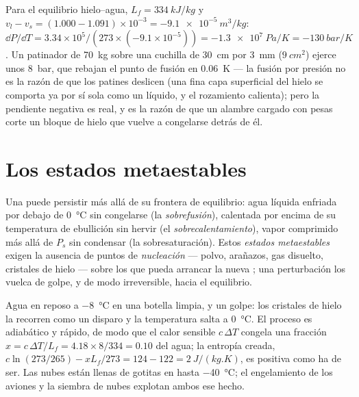 \begin{example}\label{ex:b1:phase-changes:skate}
Para el equilibrio hielo--agua, $L_f = \qty{334}{kJ/kg}$ y $v_l - v_s = (1.000 - 1.091)
\times 10^{-3} = \qty{-9.1e-5}{m^3/kg}$: $\dd P/\dd T = 3.34 \times 10^5/(273 \times
(-9.1 \times 10^{-5})) = \qty{-1.3e7}{Pa/K} = \qty{-130}{bar/K}$. Un patinador
de \qty{70}{kg} sobre una cuchilla de \qty{30}{cm} por \qty{3}{mm} ($\qty{9}{cm^2}$) ejerce
unos \qty{8}{bar}, que rebajan el punto de fusión en \qty{0.06}{K} --- la fusión por presión no es la razón de que los patines deslicen (una fina
capa superficial del hielo se comporta ya por sí sola como un líquido, y
el rozamiento calienta); pero la pendiente negativa es real, y es la
razón de que un alambre cargado con pesas corte un bloque de hielo que
vuelve a congelarse detrás de él.
\end{example}

\section{Los estados metaestables}

\begin{definition}\label{def:b1:phase-changes:metastable}
Una  puede persistir más allá de su frontera de equilibrio: agua
líquida enfriada por debajo de \qty{0}{\degreeCelsius} sin congelarse (la
\emph{sobrefusión}), calentada por encima de su temperatura de ebullición
sin hervir (el \emph{sobrecalentamiento}), vapor comprimido más allá de
$P_s$ sin condensar (la sobresaturación). Estos \emph{estados
metaestables} exigen la ausencia de puntos de \emph{nucleación} --- polvo,
arañazos, gas disuelto, cristales de hielo --- sobre los que pueda
arrancar la nueva ; una perturbación los vuelca de golpe, y de modo
irreversible, hacia el equilibrio.
\end{definition}

\begin{example}\label{ex:b1:phase-changes:supercooled}
Agua en reposo a \qty{-8}{\degreeCelsius} en una botella limpia, y un
golpe: los cristales de hielo la recorren como un disparo y la
temperatura salta a \qty{0}{\degreeCelsius}. El proceso es adiabático y
rápido, de modo que el calor sensible $c\,\Delta T$ congela una fracción $x = c\,\Delta T/L_f = 4.18 \times 8/334 =
0.10$ del agua; la entropía creada, $c\ln(273/265) - xL_f/273 =
124 - 122 = \qty{+2}{J/(kg.K)}$, es positiva como ha de ser. Las nubes
están llenas de gotitas en  hasta \qty{-40}{\degreeCelsius}; el
engelamiento de los aviones y la siembra de nubes explotan ambos ese hecho.
\end{example}

